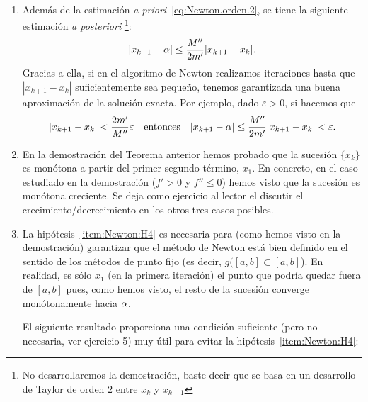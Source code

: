 \begin{remark}~
  \label{rk:4}
  \begin{enumerate}
  \item Además de la estimación \textit{a
      priori}~\eqref{eq:Newton.orden.2}, se tiene la siguiente
    estimación \textit{a posteriori}%
    \footnote{No desarrollaremos la demostración, baste decir que se basa
      en un desarrollo de Taylor de orden $2$ entre $x_k$ y
      $x_{k+1}$}:
    \begin{equation}
      |x_{k+1}-\alpha| \le \frac{M''}{2m'}|x_{k+1}-x_k|.
      \label{eq:newton.estimac.a.posteriori}
    \end{equation}
    Gracias a ella, si en el algoritmo de Newton realizamos
    iteraciones hasta que $|x_{k+1}-x_k|$ suficientemente sea pequeño,
    tenemos garantizada una buena aproximación de la solución
    exacta. Por ejemplo, dado $\varepsilon>0$, si hacemos que
    $$
    |x_{k+1}-x_k| < \frac{2m'}{M''} \varepsilon
    \quad\text{entonces}\quad 
      |x_{k+1}-\alpha| \le \frac{M''}{2m'}|x_{k+1}-x_k|<\varepsilon.
    $$ 
  \item En la demostración del Teorema anterior hemos probado que la
    sucesión $\{x_k\}$ es monótona a partir del primer segundo
    término, $x_1$. En concreto, en el caso estudiado en la
    demostración ($f'>0$ y $f''\le 0$) hemos visto que la sucesión es
    monótona creciente. Se deja como ejercicio al lector el discutir
    el crecimiento/decrecimiento en los otros tres casos posibles.
  \item La hipótesis~\ref{item:Newton:H4} es necesaria para (como
    hemos visto en la demostración) garantizar que el método de Newton
    está bien definido en el sentido de los métodos de punto fijo (es
    decir, $g([a,b]\subset [a,b]$). En realidad, es sólo $x_1$ (en la
    primera iteración) el punto que podría quedar fuera de $[a,b]$
    pues, como hemos visto, el resto de la sucesión converge
    monótonamente hacia $\alpha$.

    El siguiente resultado proporciona una condición suficiente (pero
    no necesaria, ver ejercicio 5) muy útil para evitar la
    hipótesis~\ref{item:Newton:H4}:
  \end{enumerate}
\end{remark}

